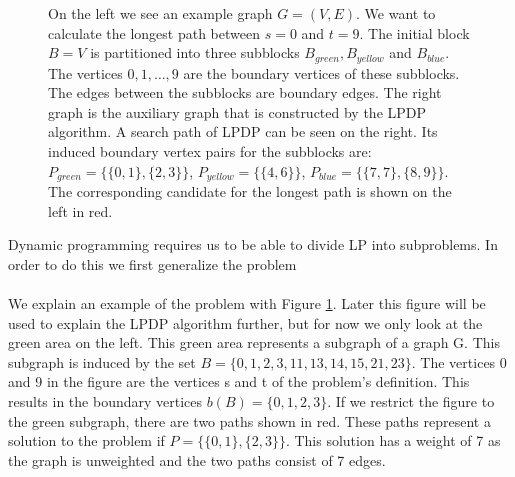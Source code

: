 \documentclass[11pt]{article}
\begin{document}
\begin{figure}
\begin{tabular}{cc}
\end{tabular}
\caption{On the left we see an example graph $G = (V, E)$. We want to calculate the longest path between $s = 0$ and $t = 9$. The initial block $B=V$ is partitioned into three subblocks $B_{green},  B_{yellow}$ and $B_{blue}$. The vertices $0,1,\ldots, 9$ are the boundary vertices of these subblocks. The edges between the subblocks are boundary edges. The right graph is the auxiliary graph that is constructed by the LPDP algorithm. A search path of LPDP can be seen on the right. Its induced boundary vertex pairs for the subblocks are: $P_{green} = \{\{0,1\}, \{2,3\}\}$, $P_{yellow} = \{\{4,6\}\}$, $P_{blue} = \{\{7,7\}, \{8,9\}\}$. The corresponding candidate for the longest path is shown on the left in red.
}
\label{fig:lpdpexample}
\end{figure}
Dynamic programming requires us to be able to divide LP into subproblems. In order to do this we first generalize the problem\\

\noindent{}
\\

We explain an example of the problem with Figure \ref{fig:lpdpexample}. Later this figure will be used to explain the LPDP algorithm further, but for now we only look at the green area on the left. This green area represents a subgraph of a graph G. This subgraph is induced by the set $B = \{0, 1, 2, 3, 11, 13, 14, 15, 21, 23\}$. The vertices 0 and 9 in the figure are the vertices s and t of the problem's definition. This results in the boundary vertices $b(B) = \{0, 1, 2, 3\}$. If we restrict the figure to the green subgraph, there are two paths shown in red. These paths represent a solution to the problem if $P = \{\{0,1\},\{2,3\}\}$. This solution has a weight of 7 as the graph is unweighted and the two paths consist of 7 edges.\\
\end{document}
